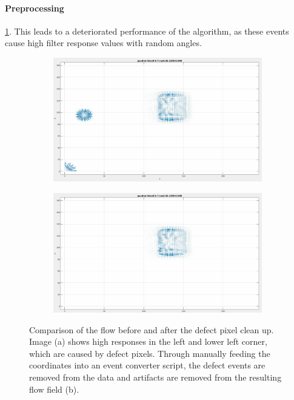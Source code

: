 \paragraph{Preprocessing}
 \ref{fig:defect-pixel-cleanup}. 
This leads to a deteriorated performance of the algorithm, as these events cause high filter response values with random angles.

\begin{figure}[tb]
\centering
\begin{subfigure}{.45\textwidth}
  \centering
  \includegraphics[height=.5\linewidth]{figs/defect-pixels/defect-quadrat.png}
  \caption{}
\end{subfigure}
\begin{subfigure}{.45\textwidth}
  \centering
  \includegraphics[height=.5\linewidth]{figs/defect-pixels/cleaned-quadrat.png}  \caption{}
\end{subfigure}
\caption[Preprocessing step: Removing events from defect pixels.]{Comparison of the flow before and after the defect pixel clean up. Image (a) shows high responses in the left and lower left corner, which are caused by defect pixels. Through manually feeding the coordinates into an event converter script, the defect events are removed from the data and artifacts are removed from the resulting flow field (b).}
\label{fig:defect-pixel-cleanup}
\end{figure}



